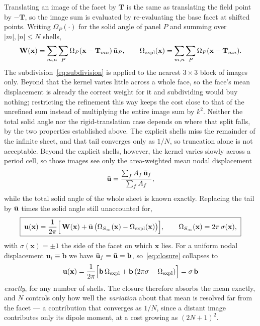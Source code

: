 Translating an image of the facet by $\mathbf{T}$ is the same as translating the
field point by $-\mathbf{T}$, so the image sum is evaluated by re-evaluating the
base facet at shifted points. Writing $\Omega_P(\cdot)$ for the solid angle of
panel $P$ and summing over $\lvert m\rvert, \lvert n\rvert \le N$ shells,
\begin{equation}
  \mathbf{W}(\mathbf{x})
  = \sum_{m,n}\sum_P \Omega_P(\mathbf{x}-\mathbf{T}_{mn})\, \bar{\mathbf{u}}_P ,
  \qquad
  \Omega_{\text{expl}}(\mathbf{x})
  = \sum_{m,n}\sum_P \Omega_P(\mathbf{x}-\mathbf{T}_{mn}) .
  \label{eq:shells}
\end{equation}
The subdivision~\eqref{eq:subdivision} is applied to the nearest $3\times3$
block of images only. Beyond that the kernel varies little across a whole face,
so the face's mean displacement is already the correct weight for it and
subdividing would buy nothing; restricting the refinement this way keeps the
cost close to that of the unrefined sum instead of multiplying the entire image
sum by $k^{2}$. Neither the total solid angle nor the rigid-translation case
depends on where that split falls, by the two properties established above.
The explicit shells miss the remainder of the infinite sheet, and that tail
converges only as $1/N$, so truncation alone is not acceptable. Beyond the
explicit shells, however, the kernel varies slowly across a period cell, so
those images see only the area-weighted mean nodal displacement
\begin{equation}
  \bar{\mathbf{u}} = \frac{\sum_f A_f\, \bar{\mathbf{u}}_f}{\sum_f A_f} ,
  \label{eq:mean-displacement}
\end{equation}
while the total solid angle of the whole sheet is known exactly. Replacing the
tail by $\bar{\mathbf{u}}$ times the solid angle still unaccounted for,
\begin{equation}
  \boxed{\;
  \mathbf{u}(\mathbf{x})
  = \frac{1}{2\pi}
    \Bigl[\, \mathbf{W}(\mathbf{x})
      + \bar{\mathbf{u}}\,\bigl( \Omega_{S_{\infty}}(\mathbf{x})
                    - \Omega_{\text{expl}}(\mathbf{x}) \bigr) \Bigr] ,
  \qquad
  \Omega_{S_{\infty}}(\mathbf{x}) = 2\pi\,\sigma(\mathbf{x}) ,
  \;}
  \label{eq:closure}
\end{equation}
with $\sigma(\mathbf{x}) = \pm 1$ the side of the facet on which $\mathbf{x}$
lies. For a uniform nodal displacement $\mathbf{u}_i \equiv \mathbf{b}$ we have
$\bar{\mathbf{u}}_f = \bar{\mathbf{u}} = \mathbf{b}$, so~\eqref{eq:closure} collapses to
\begin{equation}
  \mathbf{u}(\mathbf{x})
  = \frac{1}{2\pi}\Bigl[ \mathbf{b}\,\Omega_{\text{expl}}
      + \mathbf{b}\,(2\pi\sigma - \Omega_{\text{expl}}) \Bigr]
  = \sigma\,\mathbf{b}
  \label{eq:uniform-check}
\end{equation}
\emph{exactly}, for any number of shells. The closure therefore absorbs the mean
exactly, and $N$ controls only how well the \emph{variation} about that mean is
resolved far from the facet --- a contribution that converges as $1/N$, since a
distant image contributes only its dipole moment, at a cost growing as
$(2N+1)^2$.

